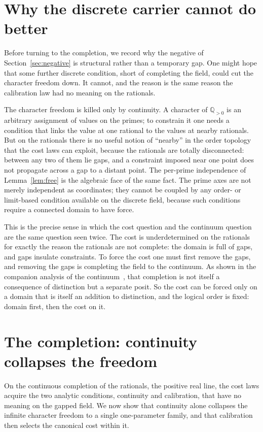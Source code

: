 \documentclass[11pt,a4paper]{article}
\theoremstyle{definition}
\theoremstyle{remark}
\newcommand{\Qpos}{\mathbb{Q}_{>0}}
\begin{document}
\section{Why the discrete carrier cannot do better}\label{sec:obstruction}

Before turning to the completion, we record why the negative of
Section~\ref{sec:negative} is structural rather than a temporary gap. One might
hope that some further discrete condition, short of completing the field, could
cut the character freedom down. It cannot, and the reason is the same reason the
calibration law had no meaning on the rationals.

The character freedom is killed only by continuity. A character of $\Qpos$ is an
arbitrary assignment of values on the primes; to constrain it one needs a
condition that links the value at one rational to the values at nearby rationals.
But on the rationals there is no useful notion of ``nearby'' in the order
topology that the cost laws can exploit, because the rationals are totally
disconnected: between any two of them lie gaps, and a constraint imposed near one
point does not propagate across a gap to a distant point. The per-prime
independence of Lemma~\ref{lem:free} is the algebraic face of the same fact. The
prime axes are not merely independent as coordinates; they cannot be coupled by
any order- or limit-based condition available on the discrete field, because such
conditions require a connected domain to have force.

This is the precise sense in which the cost question and the continuum question
are the same question seen twice. The cost is underdetermined on the rationals
for exactly the reason the rationals are not complete: the domain is full of
gaps, and gaps insulate constraints. To force the cost one must first remove the
gaps, and removing the gaps is completing the field to the continuum. As shown in
the companion analysis of the continuum~\cite{WashburnContinuum2026}, that
completion is not itself a consequence of distinction but a separate posit. So the
cost can be forced only on a domain that is itself an addition to distinction, and
the logical order is fixed: domain first, then the cost on it.

\section{The completion: continuity collapses the freedom}\label{sec:completion}

On the continuous completion of the rationals, the positive real line, the cost
laws acquire the two analytic conditions, continuity and calibration, that have
no meaning on the gapped field. We now show that continuity alone collapses the
infinite character freedom to a single one-parameter family, and that calibration
then selects the canonical cost within it.
\end{document}
